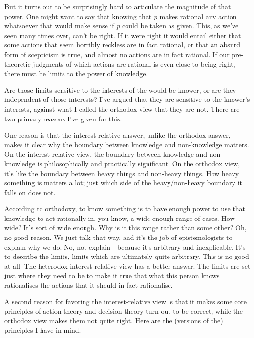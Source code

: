 \documentclass[
  11pt,
]{book}
\begin{document}
But it turns out to be surprisingly hard to articulate the magnitude of that power. One might want to say that knowing that \emph{p} makes rational any action whatsoever that would make sense if \emph{p} could be taken as given. This, as we've seen many times over, can't be right. If it were right it would entail either that some actions that seem horribly reckless are in fact rational, or that an absurd form of scepticism is true, and almost no actions are in fact rational. If our pre-theoretic judgments of which actions are rational is even close to being right, there must be limits to the power of knowledge.

Are those limits sensitive to the interests of the would-be knower, or are they independent of those interests? I've argued that they are sensitive to the knower's interests, against what I called the orthodox view that they are not. There are two primary reasons I've given for this.

One reason is that the interest-relative answer, unlike the orthodox answer, makes it clear why the boundary between knowledge and non-knowledge matters. On the interest-relative view, the boundary between knowledge and non-knowledge is philosophically and practically significant. On the orthodox view, it's like the boundary between heavy things and non-heavy things. How heavy something is matters a lot; just which side of the heavy/non-heavy boundary it falls on does not.

According to orthodoxy, to know something is to have enough power to use that knowledge to act rationally in, you know, a wide enough range of cases. How wide? It's sort of wide enough. Why is it this range rather than some other? Oh, no good reason. We just talk that way, and it's the job of epistemologists to explain why we do. No, not explain - because it's arbitrary and inexplicable. It's to describe the limits, limits which are ultimately quite arbitrary. This is no good at all. The heterodox interest-relative view has a better answer. The limits are set just where they need to be to make it true that what this person knows rationalises the actions that it should in fact rationalise.

A second reason for favoring the interest-relative view is that it makes some core principles of action theory and decision theory turn out to be correct, while the orthodox view makes them not quite right. Here are the (versions of the) principles I have in mind.
\end{document}
